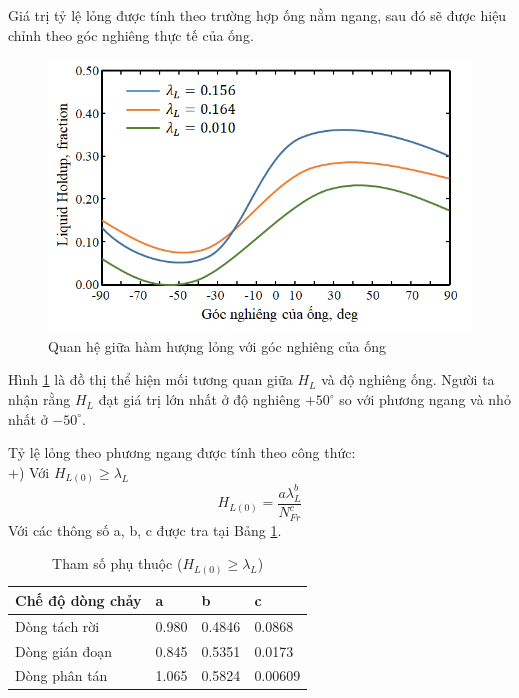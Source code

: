 \documentclass[12pt,a4paper]{report}
\begin{document}
Giá trị tỷ lệ lỏng được tính theo trường hợp ống nằm ngang, sau đó sẽ được hiệu chỉnh theo góc nghiêng thực tế của ống.
	\begin{figure}[h]
		\centering
		\includegraphics[scale=0.75]{Fig/h_l_vs_inclination_pipe.png}
		\caption{Quan hệ giữa hàm hượng lỏng với góc nghiêng của ống}
		\label{fig:h_l_vs_inclination_pipe}
	\end{figure}
\newline
Hình \ref{fig:h_l_vs_inclination_pipe} \cite{brill1999multiphase} là đồ thị thể hiện mối tương quan giữa $H_L$ và độ nghiêng ống. Người ta nhận rằng $H_L$ đạt giá trị lớn nhất ở độ nghiêng $+50^{\circ}$ so với phương ngang và nhỏ nhất ở $-50^{\circ}$.

Tỷ lệ lỏng theo phương ngang được tính theo công thức:\\
+) Với $H_{L(0)}\ge\lambda_L$
	\begin{equation}
   		H_{L(0)}=\dfrac{a\lambda_L^b}{N_{Fr}^c}
    \end{equation}
Với các thông số a, b, c được tra tại Bảng \ref{tab:dependent_params_1}.
\begin{table}[h]
\caption[Tham số phụ thuộc ($H_{L(0)} \ge \lambda_L$)]{Tham số phụ thuộc ($H_{L(0)} \ge \lambda_L$) \cite{brill1999multiphase}}\label{tab:dependent_params_1}
\begin{tabularx}{\textwidth}{@{}XXXX@{}}
\toprule
Chế độ dòng chảy & a     & b      & c       \\ \midrule
Dòng tách rời    & 0.980 & 0.4846 & 0.0868  \\
Dòng gián đoạn   & 0.845 & 0.5351 & 0.0173  \\
Dòng phân tán    & 1.065 & 0.5824 & 0.00609 \\ \bottomrule
\end{tabularx}
\end{table}
\end{document}
